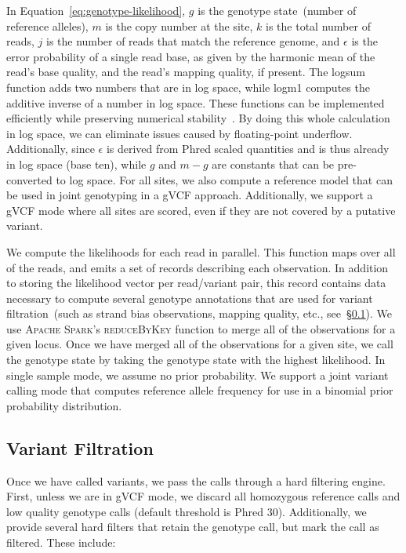 \documentclass[phd]{ucbthesis}
\begin{document}
In Equation~\eqref{eq:genotype-likelihood}, $g$ is the genotype state~(number of
reference alleles), $m$ is the copy number at the site, $k$ is the total number of
reads, $j$ is the number of reads that match the reference genome, and $\epsilon$
is the error probability of a single read base, as given by the harmonic mean of the
read's base quality, and the read's mapping quality, if present. The logsum function
adds two numbers that are in log space, while logm1 computes the additive inverse of
a number in log space. These functions can be implemented efficiently while preserving
numerical stability~\cite{durbin98}. By doing this whole calculation in log space,
we can eliminate issues caused by floating-point underflow. Additionally, since
$\epsilon$ is derived from Phred scaled quantities and is thus already in log
space (base ten), while $g$ and $m - g$ are constants that can be pre-converted to
log space. For all sites, we also compute a reference model that can be used in
joint genotyping in a gVCF approach. Additionally, we support a gVCF mode where all
sites are scored, even if they are not covered by a putative variant.

We compute the likelihoods for each read in parallel. This function maps over all
of the reads, and emits a set of records describing each observation. In addition
to storing the likelihood vector per read/variant pair, this record contains data
necessary to compute several genotype annotations that are used for variant
filtration~(such as strand bias observations, mapping quality, etc.,
see~\S\ref{sec:variant-filtration}). We use \textsc{Apache Spark}'s
\textsc{reduceByKey} function to merge all of the observations for a given
locus. Once we have merged all of the observations for a given site, we call the
genotype state by taking the genotype state with the highest likelihood. In single
sample mode, we assume no prior probability. We support a joint variant calling
mode that computes reference allele frequency for use in a binomial prior
probability distribution.

\subsection{Variant Filtration}
\label{sec:variant-filtration}

Once we have called variants, we pass the calls through a hard filtering engine.
First, unless we are in gVCF mode, we discard all homozygous reference calls and
low quality genotype calls (default threshold is Phred 30). Additionally, we
provide several hard filters that retain the genotype call, but mark the call as
filtered. These include:
\end{document}
